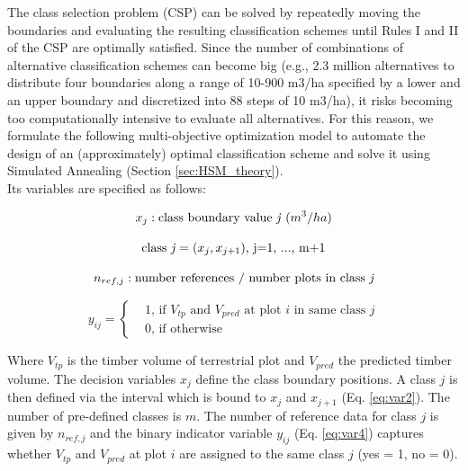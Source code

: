 The class selection problem (CSP) can be solved by repeatedly moving the boundaries and evaluating the resulting classification schemes until Rules I and II of the CSP are optimally satisfied. Since the number of combinations of alternative classification schemes can become big (e.g., 2.3 million alternatives to distribute four boundaries along a range of 10-900 m$3$/ha specified by a lower and an upper boundary and discretized into 88 steps of 10 m$3$/ha), it risks becoming too computationally intensive to evaluate all alternatives. For this reason, we formulate the following multi-objective optimization model to automate the design of an (approximately) optimal classification scheme and solve it using Simulated Annealing (Section \ref{sec:HSM_theory}).\\

Its variables are specified as follows:

\begin{equation}\label{eq:var1}
x_j: \text{class boundary value \textit{j} } (m^3/ha)
\end{equation}

\begin{equation}\label{eq:var2}
\text{class \textit{j}}=(x_j, x_{j+1}) \text{, j=1, ..., m+1}
\end{equation}

\begin{equation}\label{eq:var3}
n_{ref,j}: \text{number references / number plots in class \textit{j}}
\end{equation}

\begin{equation}\label{eq:var4}
y_{ij}=\begin{cases}&1 \text{, if $V_{tp}$ and $V_{pred}$ at plot $i$ in same class $j$}\\
&0 \text{, if otherwise}
\end{cases}
\end{equation}

Where $V_{tp}$ is the timber volume of terrestrial plot and $V_{pred}$ the predicted timber volume. The decision
variables $x_j$ define the class boundary positions. A class $j$ is then defined via the interval which is bound to $x_j$ and $x_{j+1}$ (Eq. \ref{eq:var2}). The number of pre-defined classes is $m$. The number of reference data for class
$j$ is given by $n_{ref,j}$ and the binary indicator variable $y_{ij}$ (Eq. \ref{eq:var4}) captures whether $V_{tp}$ and $V_{pred}$ at plot $i$ are assigned to the same class $j$ (yes = 1, no = 0).\\

